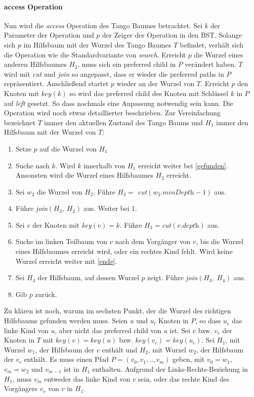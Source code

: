 \documentclass[a4paper,12pt]{article}
\begin{document}
\paragraph{access Operation}
Nun wird die \textit{access} Operation des Tango Baumes betrachtet. Sei $k$ der Parameter der Operation und $p$ der Zeiger der Operation in den BST. Solange sich $p$ im Hilfsbaum mit der Wurzel des Tango Baumes $T$ befindet, verhält sich die Operation wie die Standardvariante von \textit{search}. Erreicht $p$ die Wurzel eines anderen Hilfsbaumes $H_2$, muss sich ein preferred child in $P$ verändert haben. $T$ wird mit \textit{cut} und \textit{join} so angepasst, dass er wieder die preferred paths in $P$ repräsentiert. Anschließend startet $p$ wieder an der Wurzel von $T$. Erreicht $p$ den Knoten mit $\mathit{key}\left(k\right)$ so wird das preferred child des Knoten mit Schlüssel $k$ in $P$ auf \textit{left} gesetzt. So dass nochmals eine Anpassung notwendig sein kann. Die Operation wird noch etwas detaillierter beschrieben. Zur Vereinfachung bezeichnet $T$ immer den aktuellen Zustand des Tango Baums und $H_1$ immer den Hilfsbaum mit der Wurzel von $T$:
\begin{enumerate}
	\item Setze $p$ auf die Wurzel von $H_1$
	\item Suche nach $k$. Wird $k$ innerhalb von $H_1$ erreicht weiter bei \ref{gefunden}. Ansonsten wird die Wurzel eines Hilfsbaumes $H_2$ erreicht.
	\item Sei $w_2$ die Wurzel von $H_2$. Führe $H_3 =$ \textit{cut}$\left(w_2.\textit{minDepth} - 1\right)$ aus.
	\item Führe \textit{join}$\left(H_3, ~H_2\right)$ aus. Weiter bei 1.
	\item \label{gefunden} Sei $v$ der Knoten mit \textit{key}$\left(v\right) = k$. Führe $H_3=$\textit{cut}$ \left(v.\textit{depth}\right)$ aus. 
	\item Suche im linken Teilbaum von $v$ nach dem Vorgänger von $v$, bis die Wurzel eines Hilfsbaumes erreicht wird, oder ein rechtes Kind fehlt. Wird keine Wurzel erreicht weiter mit \ref{ende}.
	\item Sei $H_4$ der Hilfsbaum, auf dessen Wurzel $p$ zeigt. Führe \textit{join}$\left(H_3, ~H_4\right)$ aus.
	\item \label{ende} Gib $p$ zurück.
\end{enumerate}
Zu klären ist noch, warum im sechsten Punkt, der die Wurzel des richtigen Hilfsbaums gefunden werden muss. Seien $u$ und $u_l$ Knoten in $P$, so dass $u_c$ das linke Kind von $u$, aber nicht das preferred child von $u$ ist. Sei $v$ bzw. $v_c$ der Knoten in $T$ mit $\mathit{key}\left(v\right) = \mathit{key}\left(u\right)$ bzw. $\mathit{key}\left(v_c\right) = \mathit{key}\left(u_c\right)$. Sei $H_1$, mit Wurzel $w_1$, der Hilfsbaum der $v$ enthält und $H_2$, mit Wurzel $w_2$, der Hilfsbaum der $v_c$ enthält. Es muss einen Pfad $P = \left(v_0, v_1,.., v_m \right)$ geben, mit $v_0 = w_1$, $v_m = w_2$ und $v_{m-1}$ ist in $H_1$ enthalten. Aufgrund der Links-Rechts-Beziehung in $H_1$, muss $v_m$ entweder das linke Kind von $v$ sein, oder das rechte Kind des Vorgängers $v_v$ von $v$ in $H_1$. \\
\end{document}
